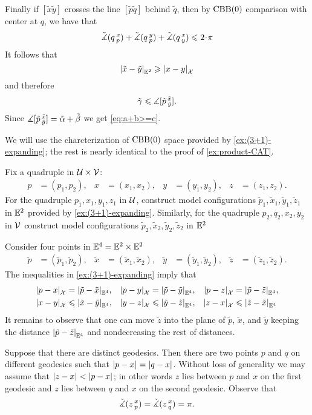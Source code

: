 Finally if $[\tilde x \tilde y]$ crosses the line $[\tilde p\tilde q]$ behind $\tilde q$,
then by $\mathrm{CBB}(0)$ comparison with center at $q$, we have that 
\[\angk qxp+\angk qyp+\angk qxy\le 2\cdot\pi\]
It follows that 
\[\dist{\tilde x}{\tilde y}{\EE^2}\ge\dist{ x}{ y}{\spc{X}}\]
and therefore 
\[\tilde \gamma\leqslant \measuredangle[\tilde p\,{}^{\tilde x}_{\tilde y}].\]
Since $\measuredangle[\tilde p\,{}^{\tilde x}_{\tilde y}]=\tilde\alpha+\tilde\beta$ we get \ref{eq:a+b>=c}.

We will use the charcterization of $\mathrm{CBB}(0)$ space provided by \ref{ex:(3+1)-expanding}; the rest is nearly identical to the proof of \ref{ex:product-CAT}.

Fix a quadruple in $\mathcal{U}\times \mathcal{V}$:
\begin{align*}
p&=(p_1,p_2),
&
x&=(x_1,x_2),
&
y&=(y_1,y_2),
&
z&=(z_1,z_2).
\end{align*}
For the quadruple $p_1,x_1,y_1,z_1$ in $\mathcal{U}$,
construct model configurations  $\tilde p_1,\tilde x_1,\tilde y_1,\tilde z_1$ in $\mathbb{E}^2$ provided by \ref{ex:(3+1)-expanding}.  
Similarly, for the quadruple $p_2,q_2,x_2,y_2$ in $\mathcal{V}$
construct model configurations  $\tilde p_2,\tilde x_2,\tilde y_2,\tilde z_2$ in $\mathbb{E}^2$

Consider four points in $\mathbb{E}^4=\mathbb{E}^2\times\mathbb{E}^2$ 
\begin{align*}
\tilde p&=(\tilde p_1,\tilde p_2),
&
\tilde x&=(\tilde x_1,\tilde x_2),
&
\tilde y&=(\tilde y_1,\tilde y_2),
&
\tilde z&=(\tilde z_1,\tilde z_2).
\end{align*}
The inequalities in  \ref{ex:(3+1)-expanding} imply that
\begin{align*}
\dist{p}{x}{\spc{X}}&=\dist{\tilde p}{\tilde x}{\EE^4},
&
\dist{p}{y}{\spc{X}}&=\dist{\tilde p}{\tilde y}{\EE^4},
&
\dist{p}{z}{\spc{X}}&=\dist{\tilde p}{\tilde z}{\EE^4},
\\
\dist{x}{y}{\spc{X}}&\le\dist{\tilde x}{\tilde y}{\EE^4},
&
\dist{y}{z}{\spc{X}}&\le\dist{\tilde y}{\tilde z}{\EE^4},
&
\dist{z}{x}{\spc{X}}&\le\dist{\tilde z}{\tilde x}{\EE^4}
\end{align*}
It remains to observe that one can move $\tilde z$ into the plane of $\tilde p$, $\tilde x$, and $\tilde y$ keeping the distance $\dist{\tilde p}{\tilde z}{\EE^4}$ and nondecreasing the rest of distances. 

Suppose that there are distinct geodesics.
Then there are two points $p$ and $q$ on different geodesics such that $\dist{p}{x}{}=\dist{q}{x}{}$.
Without loss of generality we may assume that $\dist{z}{x}{}<\dist{p}{x}{}$;
in other words $z$ lies between $p$ and $x$ on the first geodesic and 
$z$ lies between $q$ and $x$ on the second geodesic.
Observe that 
\[\tilde\measuredangle(z\,{}^{x}_{p})=\tilde\measuredangle(z\,{}^{x}_{q})=\pi.\]

